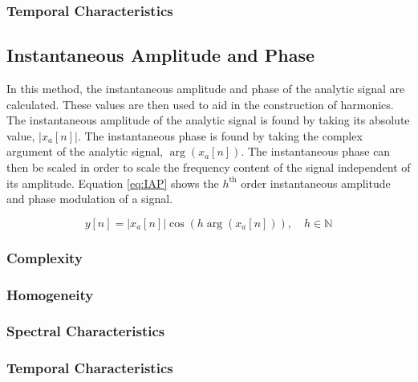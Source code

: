 		\subsubsection*{Temporal Characteristics}

	\subsection{Instantaneous Amplitude and Phase}
	\label{sec:Excitation-IAP}
		In this method, the instantaneous amplitude and phase of the analytic signal are calculated. These values
		are then used to aid in the construction of harmonics. The instantaneous amplitude of the analytic signal
		is found by taking its absolute value, $|x_{a}[n]|$. The instantaneous phase is found by taking the complex
		argument of the analytic signal, $\arg(x_{a}[n])$. The instantaneous phase can then be scaled in order to
		scale the frequency content of the signal independent of its amplitude. Equation \ref{eq:IAP} shows the
		$h^{\text{th}}$ order instantaneous amplitude and phase modulation of a signal.

		\begin{equation}
			y[n] = |x_{a}[n]| \cos \left( h\arg(x_{a}[n]) \right), \quad h \in \mathbb{N}
			\label{eq:IAP}
		\end{equation}

		\subsubsection*{Complexity}
		\subsubsection*{Homogeneity}
		\subsubsection*{Spectral Characteristics}
		\subsubsection*{Temporal Characteristics}


